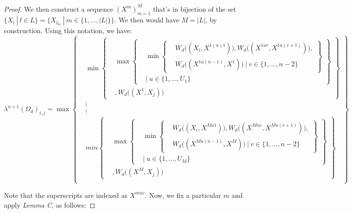 \documentclass{article} %
\begin{document}
\begin{proof}
We then construct a sequence $(X^m)_{m=1}^M$ that's in bijection of the set $\{X_l\ |\ l\in L\}=\big\{X_{l_m}\ |\ m\in\{1,\ldots,|L|\}\big\}$. We then would have $M=|L|$, by construction. Using this notation, we have:
\[
\lambda^{n+1}(\Omega_d)_{i,j} =\max
\left\{
  \begin{aligned}
    &\min
      \left\{
      \begin{aligned}
        &\max
          \left\{
          \begin{aligned}
            &\min\left\{
            \begin{aligned}
            &W_d\big((X_i,X^{1(u)1})\big), W_d\big((X^{1uv},X^{1u(v+1)})\big), \\
            &W_d\big((X^{1u(n-1)},X^1)\big)\ |\ v\in\{1,\ldots,n-2\}
            \end{aligned}
            \right\} \\
            &|\ u\in\{1,\ldots,U_1\}
          \end{aligned}
          \right\} \\
          &, W_d\big((X^1,X_j)\big)
      \end{aligned}
      \right\} \\
      &\vdots \\
      &\vdots \\
    &min
      \left\{
      \begin{aligned}
        &\max
          \left\{
          \begin{aligned}
            &\min\left\{
            \begin{aligned}
            &W_d\big((X_i,X^{Mu1})\big), W_d\big((X^{Muv},X^{Mu(v+1)})\big), \\
            &W_d\big((X^{Mu(n-1)},X^M)\big)\ |\ v\in\{1,\ldots,n-2\}
            \end{aligned}
            \right\} \\
            &|\ u\in\{1,\ldots,U_M\}
          \end{aligned}
          \right\} \\
          &, W_d\big((X^M,X_j)\big)
      \end{aligned}
      \right\} \\
  \end{aligned}
\right\}
\]

Note that the superscripts are indexed as $X^{muv}$. Now, we fix a particular $m$ and apply \textit{Lemma C}, as follows:


\end{proof}
\end{document}
